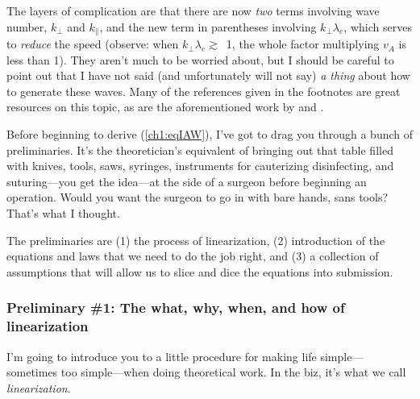 The layers of complication are that there are now \emph{two} terms involving
wave number, $k_\perp$ and $k_\parallel$, and the new term in parentheses
involving $k_\perp \lambda_e$, which serves to \emph{reduce} the \Alf speed
(observe: when $k_\perp \lambda_e \gtrsim$~1, the whole factor multiplying $v_A$
is less than 1). They aren't much to be worried about, but I should be careful
to point out that I have not said (and unfortunately will not say) \emph{a
  thing} about how to generate these waves. Many of the references given in the
footnotes are great resources on this topic, as are the aforementioned work by
\citet{Lysak1996} and \citet{Genot2004a}.

Before beginning to derive (\ref{ch1:eqIAW}), I've got to drag you through a
bunch of preliminaries. It's the theoretician's equivalent of bringing out that
table filled with knives, tools, saws, syringes, instruments for cauterizing
disinfecting, and suturing---you get the idea---at the side of a surgeon before
beginning an operation. Would you want the surgeon to go in with bare hands,
sans tools? That's what I thought.

The preliminaries are (1) the process of linearization, (2) introduction of the
equations and laws that we need to do the job right, and (3) a collection of
assumptions that will allow us to slice and dice the equations into submission.




\subsubsection{Preliminary \#1: The what, why, when, and how of linearization }

I'm going to introduce you to a little procedure for making life
simple---sometimes too simple---when doing theoretical work. In the biz, it's
what we call \emph{linearization}. 

